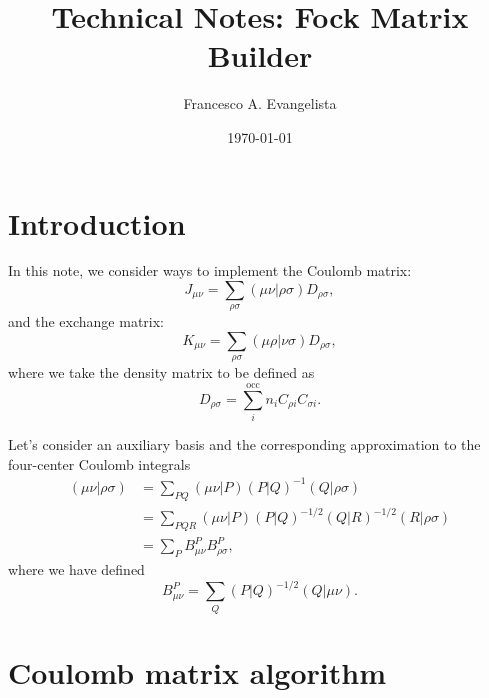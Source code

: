 \documentclass[aip,preprint]{revtex4-1}
\begin{document}
\title{Technical Notes: Fock Matrix Builder}

\author{Francesco A. Evangelista}

\date{\today}


\maketitle

\section{Introduction}
In this note, we consider ways to implement the 
Coulomb matrix:
\begin{equation}
J_{\mu \nu} = \sum_{\rho \sigma} (\mu \nu | \rho \sigma) D_{\rho \sigma},
\end{equation}
and the exchange matrix:
\begin{equation}
K_{\mu \nu} = \sum_{\rho \sigma} (\mu \rho | \nu \sigma) D_{\rho \sigma},
\end{equation}
where we take the density matrix to be defined as
\begin{equation}
D_{\rho \sigma} = \sum_i^{\mathrm{occ}} n_i C_{\rho i} C_{\sigma i}.
\end{equation}

Let's consider an auxiliary basis and the corresponding approximation to the four-center Coulomb integrals
\begin{equation}
\begin{split}
(\mu \nu | \rho \sigma) & = \sum_{PQ} (\mu \nu | P) (P|Q)^{-1} (Q|\rho \sigma) \\
& = \sum_{PQR} (\mu \nu | P) (P|Q)^{-1/2} (Q|R)^{-1/2} (R|\rho \sigma) \\
& = \sum_{P} B^{P}_{\mu \nu} B^{P}_{\rho \sigma},
\end{split}
\end{equation}
where we have defined
\begin{equation}
B^{P}_{\mu \nu} = \sum_Q (P|Q)^{-1/2} (Q|\mu \nu).
\end{equation}

\section{Coulomb matrix algorithm}
\end{document}
